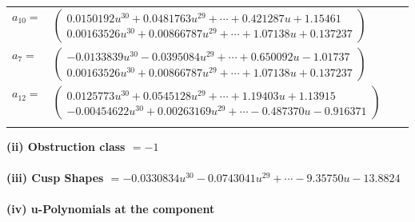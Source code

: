 \documentclass[1p]{elsarticle_modified}
\theoremstyle{definition}
\begin{document}
\begin{tabular}{m{7pt} m{180pt} m{7pt} m{180pt} }
\flushright $a_{10}=$&$\begin{pmatrix}0.0150192 u^{30}+0.0481763 u^{29}+\cdots+0.421287 u+1.15461\\0.00163526 u^{30}+0.00866787 u^{29}+\cdots+1.07138 u+0.137237\end{pmatrix}$ \\
\flushright $a_{7}=$&$\begin{pmatrix}-0.0133839 u^{30}-0.0395084 u^{29}+\cdots+0.650092 u-1.01737\\0.00163526 u^{30}+0.00866787 u^{29}+\cdots+1.07138 u+0.137237\end{pmatrix}$ \\
\flushright $a_{12}=$&$\begin{pmatrix}0.0125773 u^{30}+0.0545128 u^{29}+\cdots+1.19403 u+1.13915\\-0.00454622 u^{30}+0.00263169 u^{29}+\cdots-0.487370 u-0.916371\end{pmatrix}$\\&\end{tabular}
\flushleft \textbf{(ii) Obstruction class $= -1$}\\~\\
\flushleft \textbf{(iii) Cusp Shapes $= -0.0330834 u^{30}-0.0743041 u^{29}+\cdots-9.35750 u-13.8824$}\\~\\
\newpage\renewcommand{\arraystretch}{1}
\flushleft \textbf{(iv) u-Polynomials at the component}\newline \\
\end{document}

